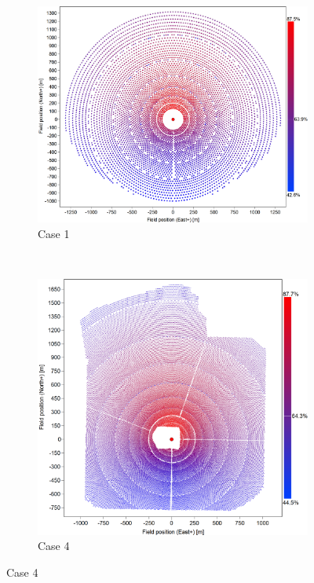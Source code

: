 \documentclass[11pt,letterpaper]{article}
\begin{document}
\begin{figure}
[htb]
\begin{subfigure}{0.48\linewidth}
	\includegraphics[width=\linewidth]{case-1}
	\caption{Case 1}
	\label{fig:cases-1}
\end{subfigure}~
\begin{subfigure}{0.48\linewidth}
	\includegraphics[width=\linewidth]{case-4}
	\caption{Case 4}
	\label{fig:cases-4}
\end{subfigure}


\end{figure}
\end{document}
